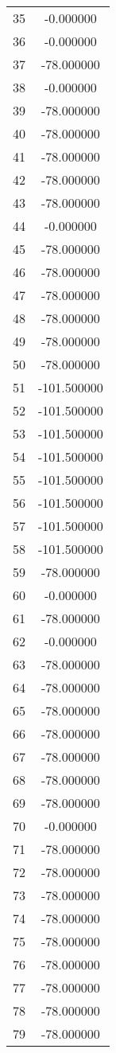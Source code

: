 \documentclass[12pt]{article}
\begin{document}
\begin{longtable}{@{}cc@{}}
35 & -0.000000 \\
36 & -0.000000 \\
37 & -78.000000 \\
38 & -0.000000 \\
39 & -78.000000 \\
40 & -78.000000 \\
41 & -78.000000 \\
42 & -78.000000 \\
43 & -78.000000 \\
44 & -0.000000 \\
45 & -78.000000 \\
46 & -78.000000 \\
47 & -78.000000 \\
48 & -78.000000 \\
49 & -78.000000 \\
50 & -78.000000 \\
51 & -101.500000 \\
52 & -101.500000 \\
53 & -101.500000 \\
54 & -101.500000 \\
55 & -101.500000 \\
56 & -101.500000 \\
57 & -101.500000 \\
58 & -101.500000 \\
59 & -78.000000 \\
60 & -0.000000 \\
61 & -78.000000 \\
62 & -0.000000 \\
63 & -78.000000 \\
64 & -78.000000 \\
65 & -78.000000 \\
66 & -78.000000 \\
67 & -78.000000 \\
68 & -78.000000 \\
69 & -78.000000 \\
70 & -0.000000 \\
71 & -78.000000 \\
72 & -78.000000 \\
73 & -78.000000 \\
74 & -78.000000 \\
75 & -78.000000 \\
76 & -78.000000 \\
77 & -78.000000 \\
78 & -78.000000 \\
79 & -78.000000 \\

\end{longtable}
\end{document}
